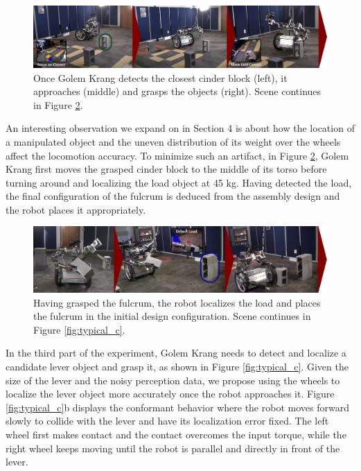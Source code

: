 \documentclass[runningheads,a4paper]{llncs}
\begin{document}
\begin{figure}[ht!] 
  \centering
  \includegraphics[width=1.0\linewidth]{Figures/a.png}
  \caption{Once Golem Krang detects the closest cinder block (left), it approaches (middle) and grasps
  the objects (right). Scene continues in Figure \ref{fig:typical_b}.}
  \label{fig:typical_a}
\end{figure}

An interesting observation we expand on in Section 4 is about how the location of a manipulated object
and the uneven distribution of its weight over the wheels affect the locomotion accuracy. To minimize
such an artifact, in Figure \ref{fig:typical_b}, Golem Krang first moves the grasped cinder block 
to the middle of its torso before turning around and localizing the load object at 45 kg. Having
detected the load, the final configuration of the fulcrum is deduced from the assembly design and
the robot places it appropriately. 

\begin{figure}[ht!] 
  \centering
  \includegraphics[width=1.0\linewidth]{Figures/b.png}
  \caption{Having grasped the fulcrum, the robot localizes the load and places the fulcrum
		in the initial design configuration. Scene continues in Figure \ref{fig:typical_c}.} 
	\label{fig:typical_b}
\end{figure}

In the third part of the experiment, Golem Krang needs to detect and localize a candidate lever
object and grasp it, as shown in Figure \ref{fig:typical_c}. Given the size of the lever and the
noisy perception data, we propose using the wheels to localize the lever object more accurately
once the robot approaches it. Figure \ref{fig:typical_c}b displays the conformant behavior where the 
robot moves forward slowly to collide with the lever and have its localization error fixed. The
left wheel first makes contact and the contact overcomes the input torque, while the right wheel 
keeps moving until the robot is parallel and directly in front of the lever. 
\end{document}
